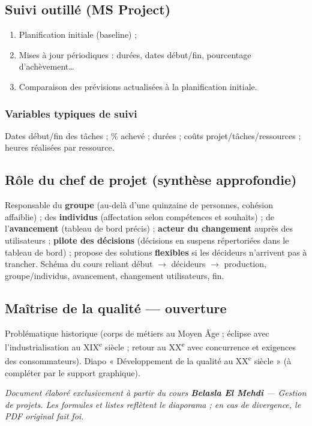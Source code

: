 \documentclass[11pt,a4paper]{article}
\begin{document}
\subsection{Suivi outillé (MS Project)}
\begin{enumerate}[nosep]
  \item Planification initiale (baseline) ;
  \item Mises à jour périodiques : durées, dates début/fin, pourcentage d'achèvement\ldots
  \item Comparaison des prévisions actualisées à la planification initiale.
\end{enumerate}

\subsubsection{Variables typiques de suivi}
Dates début/fin des tâches ; \% achevé ; durées ; coûts projet/tâches/ressources ; heures réalisées par ressource.

\subsection{Rôle du chef de projet (synthèse approfondie)}
Responsable du \textbf{groupe} (au-delà d'une quinzaine de personnes, cohésion affaiblie) ; des \textbf{individus} (affectation selon compétences et souhaits) ; de l'\textbf{avancement} (tableau de bord précis) ; \textbf{acteur du changement} auprès des utilisateurs ; \textbf{pilote des décisions} (décisions en suspens répertoriées dans le tableau de bord) ; propose des solutions \textbf{flexibles} si les décideurs n'arrivent pas à trancher. Schéma du cours reliant début $\rightarrow$ décideurs $\rightarrow$ production, groupe/individus, avancement, changement utilisateurs, fin.

\subsection{Maîtrise de la qualité — ouverture}
Problématique historique (corps de métiers au Moyen Âge ; éclipse avec l'industrialisation au XIX\textsuperscript{e} siècle ; retour au XX\textsuperscript{e} avec concurrence et exigences des consommateurs). Diapo « Développement de la qualité au XX\textsuperscript{e} siècle » (à compléter par le support graphique).

\vfill
\noindent\textit{Document élaboré exclusivement à partir du cours \textbf{Belasla El Mehdi} — Gestion de projets. Les formules et listes reflètent le diaporama ; en cas de divergence, le PDF original fait foi.}
\end{document}
